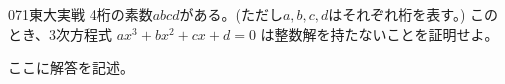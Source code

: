 \begin{thm}{071}{}{東大実戦}
 4桁の素数$abcd$がある。(ただし$a, b, c, d$はそれぞれ桁を表す。) このとき、3次方程式 $ax^3+bx^2+cx+d=0$ は整数解を持たないことを証明せよ。
\end{thm}

ここに解答を記述。